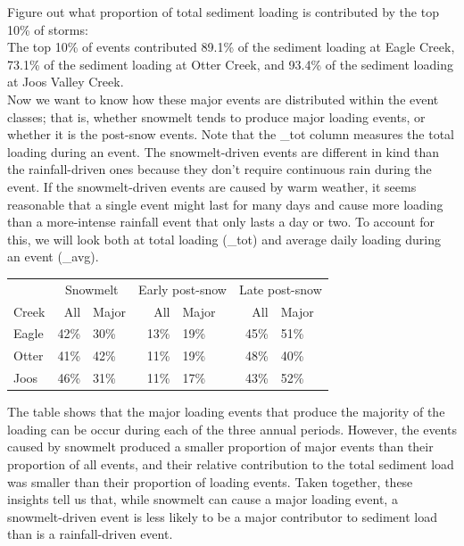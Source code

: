 \documentclass[12pt]{article}
\begin{document}
Figure out what proportion of total sediment loading is contributed by the top 10\% of storms:\\








The top 10\% of events contributed 89.1\% of the sediment loading at Eagle Creek, 73.1\% of the sediment loading at Otter Creek, and 93.4\% of the sediment loading at Joos Valley Creek.\\

Now we want to know how these major events are distributed within the event classes; that is, whether snowmelt tends to produce major loading events, or whether it is the post-snow events. Note that the \_tot column measures the total loading during an event. The snowmelt-driven events are different in kind than the rainfall-driven ones because they don't require continuous rain during the event. If the snowmelt-driven events are caused by warm weather, it seems reasonable that a single event might last for many days and cause more loading than a more-intense rainfall event that only lasts a day or two. To account for this, we will look both at total loading (\_tot) and average daily loading during an event (\_avg).\\


\begin{table}[h]
    \begin{center}
    \begin{tabular}{lr|lr|lr|l}
        & \multicolumn{2}{c}{Snowmelt    }\ & \multicolumn{2}{c}{Early post-snow}\ & \multicolumn{2}{c}{Late post-snow} \\
        Creek & All & Major & All & Major & All & Major \\
        \hline 
        Eagle & 42\% & 30\% & 13\% & 19\% & 45\% & 51\% \\
        Otter & 41\% & 42\% & 11\% & 19\% & 48\% & 40\% \\
        Joos & 46\% & 31\% & 11\% & 17\% & 43\% & 52\% \\
        
    \end{tabular}
    \end{center}
\end{table}



The table shows that the major loading events that produce the majority of the loading can be occur during each of the three annual periods. However, the events caused by snowmelt produced a smaller proportion of major events than their proportion of all events, and their relative contribution to the total sediment load was smaller than their proportion of loading events. Taken together, these insights tell us that, while snowmelt can cause a major loading event, a snowmelt-driven event is less likely to be a major contributor to sediment load than is a rainfall-driven event.\\
\end{document}
